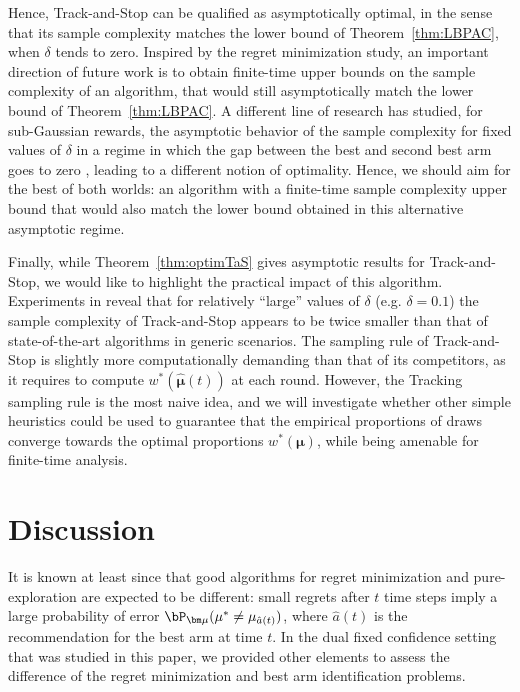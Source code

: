 \documentclass[proc]{edpsmath}
\begin{document}
	Hence, Track-and-Stop can be qualified as asymptotically optimal, in the sense that its sample complexity matches the lower bound of Theorem~\ref{thm:LBPAC}, when $\delta$ tends to zero. Inspired by the regret minimization study, an important direction of future work is to obtain finite-time upper bounds on the sample complexity of an algorithm, that would still asymptotically match the lower bound of Theorem~\ref{thm:LBPAC}. A different line of research has studied, for sub-Gaussian rewards, the asymptotic behavior of the sample complexity for fixed values of $\delta$ in a regime in which the gap between the best and second best arm goes to zero \cite{Jamiesonal14LILUCB,Chen16OptimalAlt}, leading to a different notion of optimality. Hence, we should aim for the best of both worlds: an algorithm with a finite-time sample complexity upper bound that would also match the lower bound obtained in this alternative asymptotic regime. 
	
	Finally, while Theorem~\ref{thm:optimTaS} gives asymptotic results for Track-and-Stop, we would like to highlight the practical impact of this algorithm. Experiments in \cite{GK16} reveal that for relatively ``large'' values of $\delta$ (e.g. $\delta=0.1$) the sample complexity of Track-and-Stop appears to be twice smaller than that of state-of-the-art algorithms in generic scenarios. The sampling rule of Track-and-Stop is slightly more computationally demanding than that of its competitors, as it requires to compute $w^*(\hat{\bm\mu}(t))$ at each round. However, the Tracking sampling rule is the most naive idea, and we will investigate whether other simple heuristics could be used to guarantee that the empirical proportions of draws converge towards the optimal proportions $w^*(\bm \mu)$, while being amenable for finite-time analysis. 
	
	\section{Discussion}\label{sec:Discussion}
	
	It is known at least since \cite{Bubeckal11} that good algorithms for regret minimization and pure-exploration are expected to be different: small regrets after $t$ time steps imply a large probability of error $\bP_{\bm \mu}(\mu^* \neq \mu_{\hat{a}(t)})$, where $\hat{a}(t)$ is the recommendation for the best arm at time $t$. In the dual fixed confidence setting that was studied in this paper, we provided other elements to assess the difference of the regret minimization and best arm identification problems.
	
\end{document}
